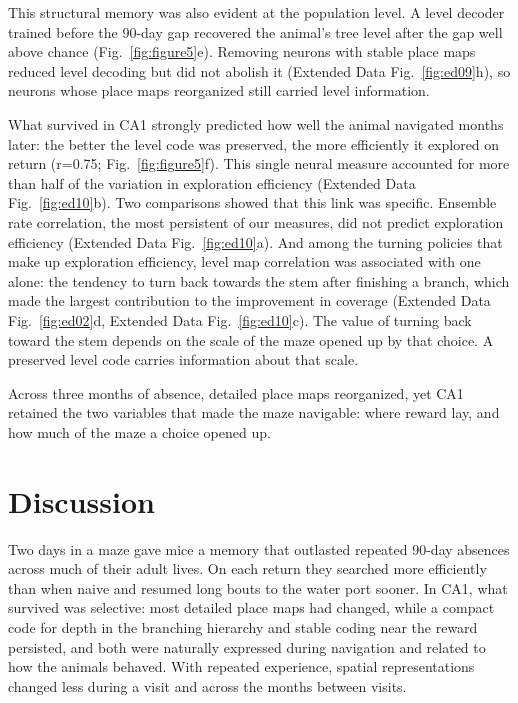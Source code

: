 \documentclass[fleqn,10pt]{wlscirep}
\begin{document}
This structural memory was also evident at the population level. A level decoder trained before the 90-day gap recovered the animal’s tree level after the gap well above chance (Fig.~\ref{fig:figure5}e). Removing neurons with stable place maps reduced level decoding but did not abolish it (Extended Data Fig.~\ref{fig:ed09}h), so neurons whose place maps reorganized still carried level information. 

What survived in CA1 strongly predicted how well the animal navigated months later: the better the level code was preserved, the more efficiently it explored on return (r=0.75; Fig.~\ref{fig:figure5}f). This single neural measure accounted for more than half of the variation in exploration efficiency (Extended Data Fig.~\ref{fig:ed10}b). Two comparisons showed that this link was specific. Ensemble rate correlation, the most persistent of our measures, did not predict exploration efficiency (Extended Data Fig.~\ref{fig:ed10}a). And among the turning policies that make up exploration efficiency, level map correlation was associated with one alone: the tendency to turn back towards the stem after finishing a branch, which made the largest contribution to the improvement in coverage (Extended Data Fig.~\ref{fig:ed02}d, Extended Data Fig.~\ref{fig:ed10}c). The value of turning back toward the stem depends on the scale of the maze opened up by that choice. A preserved level code carries information about that scale. 

Across three months of absence, detailed place maps reorganized, yet CA1 retained the two variables that made the maze navigable: where reward lay, and how much of the maze a choice opened up.

\section*{Discussion}
Two days in a maze gave mice a memory that outlasted repeated 90-day absences across much of their adult lives. On each return they searched more efficiently than when naive and resumed long bouts to the water port sooner. In CA1, what survived was selective: most detailed place maps had changed, while a compact code for depth in the branching hierarchy and stable coding near the reward persisted, and both were naturally expressed during navigation and related to how the animals behaved. With repeated experience, spatial representations changed less during a visit and across the months between visits.
\end{document}
